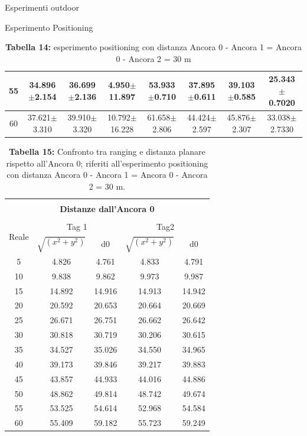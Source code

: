 \documentclass[12pt]{report}
\begin{document}
\begin{section}{Esperimenti outdoor}
\begin{subsection}{Esperimento Positioning}
\begin{table}[H]
{\begin{tabular}{|c||c|c|c||c|c|c|c||}
					\hline
				   55&34.896$\pm$2.154&36.699$\pm$2.136&4.950$\pm$11.897&   		53.933$\pm$0.710&37.895$\pm$0.611&39.103$\pm$0.585&25.343$\pm$0.7020\\
					\hline
				   60&37.621$\pm$3.310&39.910$\pm$3.320&10.792$\pm$16.228&   	61.658$\pm$2.806&44.424$\pm$2.597&45.876$\pm$2.307&33.038$\pm$2.7330\\
					\hline
				\end{tabular}
}
				\caption{\textbf{Tabella 14:} esperimento positioning con distanza Ancora 0 - Ancora 1 = Ancora 0 - Ancora 2 = 30 m\label{EspOut30}}
			\end{table}

\begin{table}[H]
				\centering
				\begin{tabular}{|c||c|c||c|c|}
					\hline
					\multicolumn{5}{|c|}{}\\
					\multicolumn{5}{|c|}{\textbf{\Large Distanze dall'Ancora 0}}\\
					\multicolumn{5}{|c|}{}\\
					\hline
					\multirow{2}{*}{Reale}&\multicolumn{2}{|c||}{Tag 1}&	\multicolumn{2}{|c|}{Tag2}\\
					\cline{2-5}
					&$\sqrt{(x^2+y^2)}$& d0& 		$\sqrt{(x^2+y^2)}$& d0\\
					\hline
				    5&4.826&    	  4.761&     4.833&    4.791\\
					\hline
    				10&9.838&     9.862&   	  9.973&    9.987\\
					\hline
   					15&14.892&   14.916&   14.913&   14.942\\
					\hline
   					20&20.592&   20.653&   20.664&   20.669\\
					\hline
   					25&26.671&   26.751&   26.662&   26.642\\
					\hline
   					30&30.818&   30.719&   30.206&   30.615\\
					\hline
  					35&34.527&   35.026&   34.550&   34.965\\
					\hline
   					40&39.173&   39.846&   39.217&   39.883\\
					\hline
   					45&43.857&   44.933&   44.016&   44.886\\
					\hline 
 					50&48.862&   49.814&   48.742&   49.674\\
					\hline
   					55&53.525&   54.614&   52.968&   54.584\\
					\hline
   					60&55.409&   59.182&   55.723&   59.249\\
					\hline
				\end{tabular}
				\caption{\textbf{Tabella 15:} Confronto tra ranging e distanza planare rispetto all'Ancora 0; riferiti all'esperimento positioning con distanza Ancora 0 - Ancora 1 = Ancora 0 - Ancora 2 = 30 m. \label{EspOut30}}
			\end{table}


\end{subsection}
\end{section}
\end{document}
